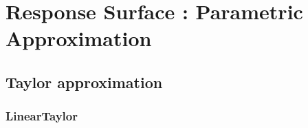 

\newpage\section{Response Surface : Parametric Approximation}




\subsection{Taylor approximation}

\subsubsection{LinearTaylor}

